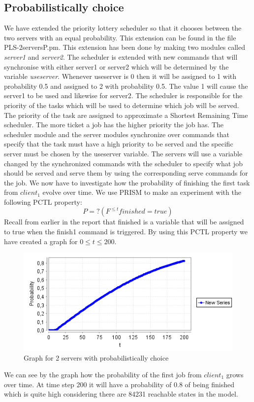 \documentclass[12pt]{report}
\begin{document}
\subsection*{Probabilistically choice}
We have extended the priority lottery scheduler so that it chooses between the two servers with an equal probability. This extension can be found in the file PLS-2serversP.pm. This extension has been done by making two modules called \emph{server1} and \emph{server2}. The scheduler is extended with new commands that will synchronise with either server1 or server2 which will be determined by the variable \emph{useserver}. Whenever useserver is 0 then it will be assigned to 1 with probability 0.5 and assigned to 2 with probability 0.5. The value 1 will cause the server1 to be used and likewise for server2. The scheduler is responsible for the priority of the tasks which will be used to determine which job will be served. The priority of the task are assigned to approximate a Shortest Remaining Time scheduler. The more ticket a job has the higher priority the job has. The scheduler module and the server modules synchronize over commands that specify that the task must have a high priority to be served and the specific server must be chosen by the useserver variable. The servers will use a variable changed by the synchronized commands with the scheduler to specify what job should be served and serve them by using the corresponding serve commands for the job. We now have to investigate how the probability of finishing the first task from $client_1$ evolve over time. We use PRISM to make an experiment with the following PCTL property:
$$P=? ( F^{\leq t} finished=true)$$
Recall from earlier in the report that finished is a variable that will be assigned to true when the finish1 command is triggered. By using this PCTL property we have created a graph for $0 \leq t \leq 200$.
\begin{figure}[H]
	\begin{center}
		\includegraphics[scale=0.75]{../GFX/C1.png}
	\end{center}
	\caption{Graph for 2 servers with probabilistically choice}
\end{figure}
We can see by the graph how the probability of the first job from $client_1$ grows over time. At time step 200 it will have a probability of 0.8 of being finished which is quite high considering there are 84231 reachable states in the model.
\end{document}
